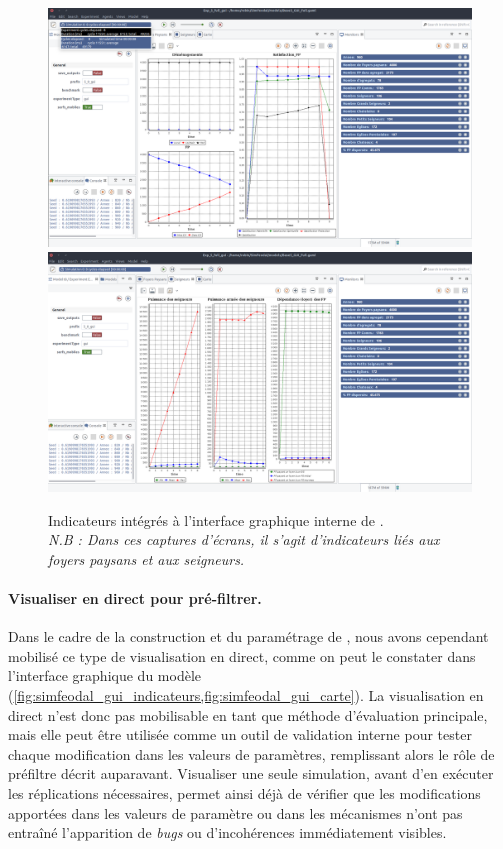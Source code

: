 \begin{figure}[H]
	\captionsetup{width=\linewidth}
	\includegraphics[width=\linewidth]{img/SimFeodal_GUI_FP.png}
	\includegraphics[width=\linewidth]{img/SimFeodal_GUI_seigneurs.png}
	\caption[Indicateurs intégrés à l'interface graphique interne de \simfeodal{}.]{Indicateurs intégrés à l'interface graphique interne de \simfeodal{}.\\
	\textit{N.B : Dans ces captures d'écrans, il s'agit d'indicateurs liés aux foyers paysans et aux seigneurs.}}
	\label{fig:simfeodal_gui_indicateurs}
\end{figure}

\paragraph{Visualiser en direct pour pré-filtrer.}

Dans le cadre de la construction et du paramétrage de \simfeodal{}, nous avons cependant mobilisé ce type de visualisation en direct, comme on peut le constater dans l'interface graphique du modèle (\cref{fig:simfeodal_gui_indicateurs,fig:simfeodal_gui_carte}).
La visualisation en direct n'est donc pas mobilisable en tant que méthode d'évaluation principale, mais elle peut être utilisée comme un outil de validation interne pour tester chaque modification dans les valeurs de paramètres, remplissant alors le rôle de \og préfiltre\fg{} décrit auparavant.
Visualiser une seule simulation, avant d'en exécuter les réplications nécessaires, permet ainsi déjà de vérifier que les modifications apportées dans les valeurs de paramètre ou dans les mécanismes n'ont pas entraîné l'apparition de \textit{bugs} ou d'incohérences immédiatement visibles.

